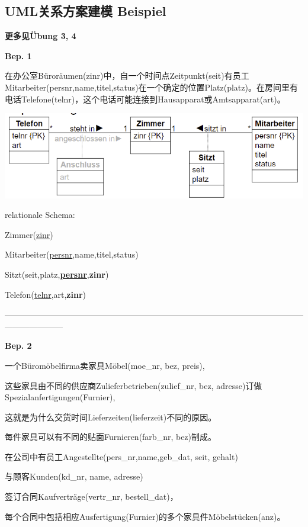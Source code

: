 \documentclass[fleqn]{article}
\begin{document}
\subsection{UML关系方案建模 Beispiel}

\noindent\textbf{更多见Übung 3, 4}

\noindent\textbf{Bep. 1}

在办公室Büroräumen(zinr)中，自一个时间点Zeitpunkt(seit)有员工Mitarbeiter(persnr,name,titel,status)在一个确定的位置Platz(platz)。在房间里有电话Telefone(telnr)，这个电话可能连接到Hausapparat或Amtsapparat(art)。

\begin{center} 
    \includegraphics[scale=0.5]{7.png}
\end{center}

\noindent relationale Schema:

Zimmer(\underline{zinr})

Mitarbeiter(\underline{persnr},name,titel,status)

Sitzt(seit,platz,\underline{\textbf{persnr}},\textbf{zinr})

Telefon(\underline{telnr},art,\textbf{zinr})

\noindent---------------------------------------------------------------------------------------------------------------------------------

\noindent\textbf{Bep. 2}

一个Büromöbelfirma卖家具Möbel(moe\_nr, bez, preis),

这些家具由不同的供应商Zulieferbetrieben(zulief\_nr, bez, adresse)订做Spezialanfertigungen(Furnier),

这就是为什么交货时间Lieferzeiten(lieferzeit)不同的原因。

每件家具可以有不同的贴面Furnieren(farb\_nr, bez)制成。

在公司中有员工Angestellte(pers\_nr,name,geb\_dat, seit, gehalt)

与顾客Kunden(kd\_nr, name, adresse)

签订合同Kaufverträge(vertr\_nr, bestell\_dat)，

每个合同中包括相应Ausfertigung(Furnier)的多个家具件Möbelstücken(anz)。
\end{document}
